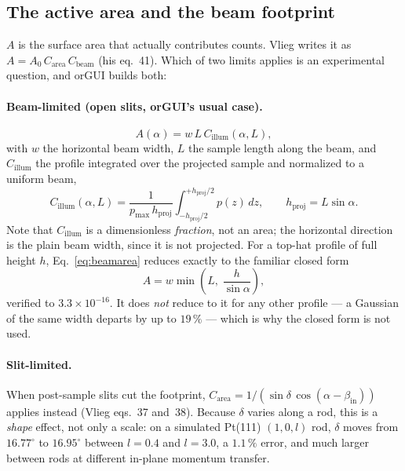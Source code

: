 \documentclass[11pt,a4paper]{article}
\newcommand{\Carea}{C_{\mathrm{area}}}
\newcommand{\Cbeam}{C_{\mathrm{beam}}}
\newcommand{\Cillum}{C_{\mathrm{illum}}}
\newcommand{\bin}{\beta_{\mathrm{in}}}
\begin{document}
\subsection{The active area and the beam footprint}
\label{sec:area}

$A$ is the surface area that actually contributes counts. Vlieg writes it as
$A = A_0\,\Carea\,\Cbeam$ (his eq.~41). Which of two limits applies is an
experimental question, and orGUI builds both:

\paragraph{Beam-limited (open slits, orGUI's usual case).}
\begin{equation}
  A(\alpha) = w\, L\, \Cillum(\alpha, L) ,
  \label{eq:beamarea}
\end{equation}
with $w$ the horizontal beam width, $L$ the sample length along the beam, and
$\Cillum$ the profile integrated over the projected sample and normalized to a
uniform beam,
\begin{equation}
  \Cillum(\alpha,L)
    = \frac{1}{p_{\max}\, h_{\mathrm{proj}}}
      \int_{-h_{\mathrm{proj}}/2}^{+h_{\mathrm{proj}}/2} p(z)\, dz ,
  \qquad h_{\mathrm{proj}} = L\sin\alpha .
\end{equation}
Note that $\Cillum$ is a dimensionless \emph{fraction}, not an area; the
horizontal direction is the plain beam width, since it is not projected. For a
top-hat profile of full height $h$, Eq.~\eqref{eq:beamarea} reduces exactly to
the familiar closed form
\begin{equation}
  A = w \min\!\left(L,\; \frac{h}{\sin\alpha}\right) ,
\end{equation}
verified to $3.3\times10^{-16}$. It does \emph{not} reduce to it for any other
profile --- a Gaussian of the same width departs by up to $19\,\%$ --- which
is why the closed form is not used.

\paragraph{Slit-limited.} When post-sample slits cut the footprint,
$\Carea = 1/(\sin\delta\,\cos(\alpha - \bin))$ applies instead (Vlieg eqs.~37
and~38). Because $\delta$ varies along a rod, this is a \emph{shape} effect,
not only a scale: on a simulated Pt(111) $(1,0,l)$ rod, $\delta$ moves from
$16.77^{\circ}$ to $16.95^{\circ}$ between $l = 0.4$ and $l = 3.0$, a
$1.1\,\%$ error, and much larger between rods at different in-plane momentum
transfer.
\end{document}
